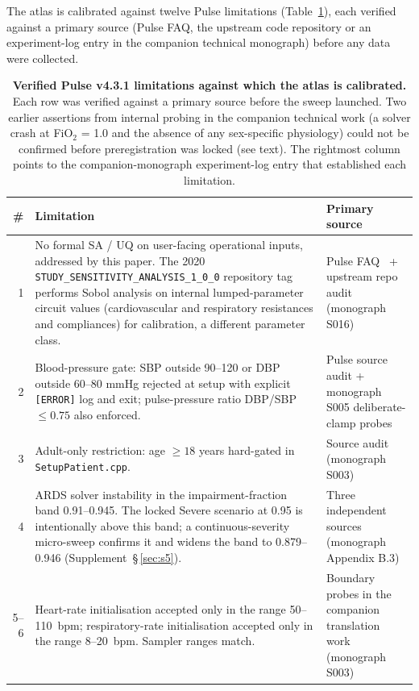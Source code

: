 \documentclass[pdflatex,sn-nature]{sn-jnl}%
\begin{document}
The atlas is calibrated against twelve Pulse limitations (Table~\ref{tab:limits}), each verified against a primary source (Pulse FAQ, the upstream code repository or an experiment-log entry in the companion technical monograph) before any data were collected.

\begin{table}[htbp]
\centering
\caption{\textbf{Verified Pulse v4.3.1 limitations against which the atlas is calibrated.} Each row was verified against a primary source before the sweep launched. Two earlier assertions from internal probing in the companion technical work (a solver crash at FiO$_2$ = 1.0 and the absence of any sex-specific physiology) could not be confirmed before preregistration was locked (see text). The rightmost column points to the companion-monograph experiment-log entry that established each limitation.}
\label{tab:limits}
\footnotesize
\begin{tabular}{rp{8.5cm}p{3.5cm}}
\toprule
\# & Limitation & Primary source \\
\midrule
1 & No formal SA / UQ on user-facing operational inputs, addressed by this paper. The 2020 \texttt{STUDY\_SENSITIVITY\_ANALYSIS\_1\_0\_0} repository tag performs Sobol analysis on internal lumped-parameter circuit values (cardiovascular and respiratory resistances and compliances) for calibration, a different parameter class. & Pulse FAQ~\cite{pulsefaq} + upstream repo audit (monograph S016) \\
\midrule
2 & Blood-pressure gate: SBP outside 90--120 or DBP outside 60--80 mmHg rejected at setup with explicit \texttt{[ERROR]} log and exit; pulse-pressure ratio DBP/SBP $\leq 0.75$ also enforced. & Pulse source audit + monograph S005 deliberate-clamp probes \\
\midrule
3 & Adult-only restriction: age $\geq 18$ years hard-gated in \texttt{SetupPatient.cpp}. & Source audit (monograph S003) \\
\midrule
4 & ARDS solver instability in the impairment-fraction band 0.91--0.945. The locked Severe scenario at 0.95 is intentionally above this band; a continuous-severity micro-sweep confirms it and widens the band to 0.879--0.946 (Supplement~\S\,\ref{sec:s5}). & Three independent sources (monograph Appendix B.3) \\
\midrule
5--6 & Heart-rate initialisation accepted only in the range 50--110~bpm; respiratory-rate initialisation accepted only in the range 8--20~bpm. Sampler ranges match. & Boundary probes in the companion translation work (monograph S003) \\

\end{tabular}
\end{table}
\end{document}
